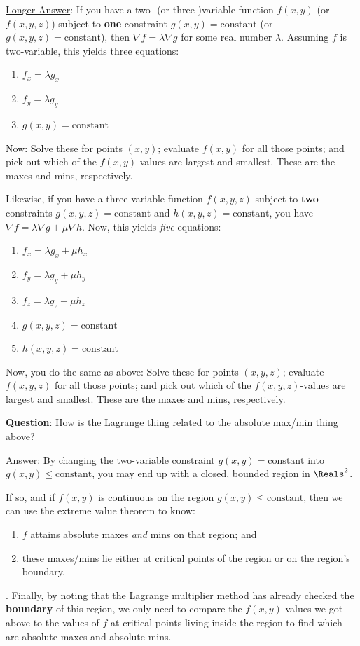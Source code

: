 \documentclass[12pt]{article}
\renewcommand{\Q}{\vspace{6mm}\noindent\textbf{Question}: }
\newcommand{\Ans}{\ul{Answer}: }
\newcommand{\Long}{\vspace{3mm}\ul{Longer Answer}: }
\begin{document}
	\Long  If you have a two- (or three-)variable function $f(x,y)$ (or $f(x,y,z)$) subject to \textbf{one} constraint $g(x,y)=\text{constant}$ (or $g(x,y,z)=\text{constant}$), then $\nabla f = \lambda\nabla g$ for some real number $\lambda$. Assuming $f$ is two-variable, this yields three equations:
	\begin{enumerate}
		\item $f_x=\lambda g_x$
		\item $f_y=\lambda g_y$
		\item $g(x,y)=\text{constant}$
	\end{enumerate}
	Now: Solve these for points $(x,y)$; evaluate $f(x,y)$ for all those points; and pick out which of the $f(x,y)$-values are largest and smallest. These are the maxes and mins, respectively.
	
	Likewise, if you have a three-variable function $f(x,y,z)$ subject to \textbf{two} constraints $g(x,y,z)=\text{constant}$ and $h(x,y,z)=\text{constant}$, you have $\nabla f = \lambda\nabla g + \mu\nabla h$. Now, this yields \textit{five} equations:
	\begin{enumerate}
		\item $f_x=\lambda g_x + \mu h_x$
		\item $f_y=\lambda g_y + \mu h_y$
		\item $f_z=\lambda g_z + \mu h_z$
		\item $g(x,y,z)=\text{constant}$
		\item $h(x,y,z)=\text{constant}$
	\end{enumerate}
	Now, you do the same as above: Solve these for points $(x,y,z)$; evaluate $f(x,y,z)$ for all those points; and pick out which of the $f(x,y,z)$-values are largest and smallest. These are the maxes and mins, respectively.
	
	\Q How is the Lagrange thing related to the absolute max/min thing above?
	
	\Ans By changing the two-variable constraint $g(x,y)=\text{constant}$ into $g(x,y)\leq\text{constant}$, you may end up with a closed, bounded region in $\Reals^2$.
	
	If so, and if $f(x,y)$ is continuous on the region $g(x,y)\leq\text{constant}$, then we can use the extreme value theorem to know: 
	\begin{enumerate}[label=(\alph*)]
		\item$f$ attains absolute maxes \textit{and} mins on that region; and 
		\item these maxes/mins lie either at critical points of the region or on the region's boundary.
	\end{enumerate}.
	Finally, by noting that the Lagrange multiplier method has already checked the \textbf{boundary} of this region, we only need to compare the $f(x,y)$ values we got above to the values of $f$ at critical points living inside the region to find which are absolute maxes and absolute mins.
\end{document}
